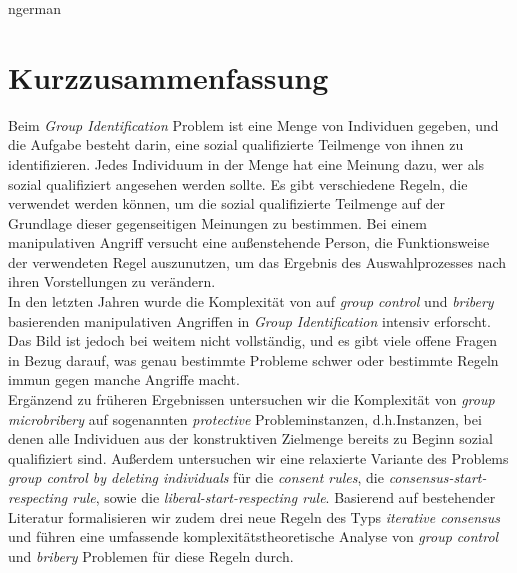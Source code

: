 \documentclass[
    12pt,               %
    a4paper,            %
    bibtotoc,           %
    pointlessnumbers,   %
    ngerman,            %
    titlepage,          %
    leqno,              %
    ]{scrarticle}       %
\begin{document}
\begin{otherlanguage*}{ngerman}

\section*{Kurzzusammenfassung}

Beim \emph{Group Identification} Problem ist eine Menge von Individuen gegeben, und die Aufgabe besteht darin, eine sozial qualifizierte Teilmenge von ihnen zu identifizieren. Jedes Individuum in der Menge hat eine Meinung dazu, wer als sozial qualifiziert angesehen werden sollte. Es gibt verschiedene Regeln, die verwendet werden können, um die sozial qualifizierte Teilmenge auf der Grundlage dieser gegenseitigen Meinungen zu bestimmen. Bei einem manipulativen Angriff versucht eine außenstehende Person, die Funktionsweise der verwendeten Regel auszunutzen, um das Ergebnis des Auswahlprozesses nach ihren Vorstellungen zu verändern.
\\
In den letzten Jahren wurde die Komplexität von auf \emph{group control} und \emph{bribery} basierenden manipulativen Angriffen in \emph{Group Identification} intensiv erforscht. Das Bild ist jedoch bei weitem nicht vollständig, und es gibt viele offene Fragen in Bezug darauf, was genau bestimmte Probleme schwer oder bestimmte Regeln immun gegen manche Angriffe macht.
\\
Ergänzend zu früheren Ergebnissen untersuchen wir die Komplexität von \emph{group microbribery} auf sogenannten \emph{protective} Probleminstanzen, d.h.\@ Instanzen, bei denen alle Individuen aus der konstruktiven Zielmenge bereits zu Beginn sozial qualifiziert sind. Außerdem untersuchen wir eine relaxierte Variante des Problems \emph{group control by deleting individuals} für die \emph{consent rules}, die \emph{consensus-start-respecting rule}, sowie die \emph{liberal-start-respecting rule}. Basierend auf bestehender Literatur formalisieren wir zudem drei neue Regeln des Typs \emph{iterative consensus} und führen eine umfassende komplexitätstheoretische Analyse von \emph{group control} und \emph{bribery} Problemen für diese Regeln durch.

\end{otherlanguage*}

\cleardoublepage




\tableofcontents{}
\end{document}
